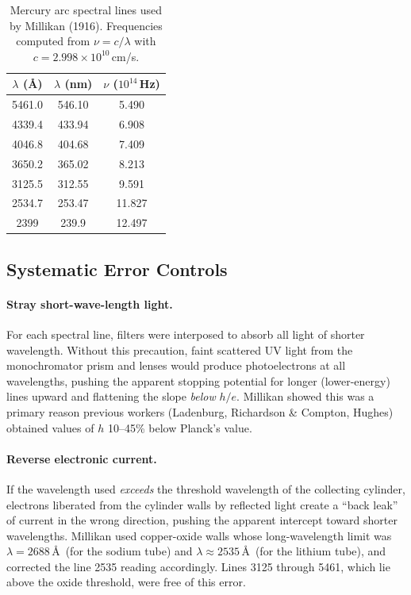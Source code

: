 \documentclass[12pt]{article}
\begin{document}
\begin{table}[ht]
\centering
\caption{Mercury arc spectral lines used by Millikan (1916).
Frequencies computed from $\nu = c/\lambda$ with
$c = 2.998\times10^{10}$\,cm/s.}
\label{tab:hg_lines}
\begin{tabular}{ccc}
\toprule
$\lambda$ (\AA) & $\lambda$ (nm) & $\nu$ ($10^{14}$\,Hz) \\
\midrule
5461.0 & 546.10 & 5.490 \\
4339.4 & 433.94 & 6.908 \\
4046.8 & 404.68 & 7.409 \\
3650.2 & 365.02 & 8.213 \\
3125.5 & 312.55 & 9.591 \\
2534.7 & 253.47 & 11.827 \\
2399   & 239.9  & 12.497 \\
\bottomrule
\end{tabular}
\end{table}

\subsection{Systematic Error Controls}

\paragraph{Stray short-wave-length light.}  For each spectral line, filters
were interposed to absorb all light of shorter wavelength.  Without this
precaution, faint scattered UV light from the monochromator prism and lenses
would produce photoelectrons at all wavelengths, pushing the apparent
stopping potential for longer (lower-energy) lines upward and flattening the
slope \emph{below} $h/e$.  Millikan showed this was a primary reason previous
workers (Ladenburg, Richardson \& Compton, Hughes) obtained values of $h$
10--45\% below Planck's value.

\paragraph{Reverse electronic current.}  If the wavelength used \emph{exceeds}
the threshold wavelength of the collecting cylinder, electrons liberated from
the cylinder walls by reflected light create a ``back leak'' of current in the
wrong direction, pushing the apparent intercept toward shorter wavelengths.
Millikan used copper-oxide walls whose long-wavelength limit was
$\lambda = 2688$\,\AA\ (for the sodium tube) and $\lambda \approx 2535$\,\AA\
(for the lithium tube), and corrected the line 2535 reading accordingly.
Lines 3125 through 5461, which lie above the oxide threshold, were free of
this error.
\end{document}

